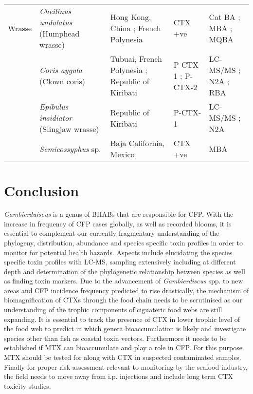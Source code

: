 \documentclass[12pt]{article}
\begin{document}
\begin{longtable}{ | p{2cm} | p{3cm} | p{4.5cm} | p{2cm} | p{3cm} | }
	\hline
	Wrasse & \emph{Cheilinus undulatus} (Humphead wrasse) & Hong Kong, China \cite{wong2005study,wong2009solid}; French Polynesia \cite{bagnis1987use} & CTX +ve \cite{bagnis1987use,wong2005study,wong2009solid} & Cat BA \cite{bagnis1987use}; MBA \cite{bagnis1987use,wong2005study,wong2009solid}; MQBA \cite{bagnis1987use} \\
	& \emph{Coris aygula} (Clown coris) & Tubuai, French Polynesia \cite{darius2007ciguatera}; Republic of Kiribati \cite{mak2013pacific} & P-CTX-1 \cite{mak2013pacific}; P-CTX-2 \cite{mak2013pacific} & LC-MS/MS \cite{mak2013pacific}; N2A \cite{mak2013pacific}; RBA \cite{darius2007ciguatera} \\
	& \emph{Epibulus insidiator} (Slingjaw wrasse) & Republic of Kiribati \cite{mak2013pacific} & P-CTX-1 \cite{mak2013pacific} & LC-MS/MS \cite{mak2013pacific}; N2A \cite{mak2013pacific} \\
	& \emph{Semicossyphus} sp. & Baja California, Mexico \cite{lechuga1995documented} & CTX +ve \cite{lechuga1995documented} & MBA \cite{lechuga1995documented}\\
	\hline
\end{longtable}

\section{Conclusion}
\emph{Gambierduiscus} is a genus of BHABs that are responsible for CFP. With the increase in frequency of CFP cases globally, as well as recorded blooms, it is essential to complement our currently fragmentary understanding of the phylogeny, distribution, abundance and species specific toxin profiles in order to monitor for potential health hazards. Aspects include elucidating the species specific toxin profiles with LC-MS, sampling extensively including at different depth and determination of the phylogenetic relationship between species as well as finding toxin markers.
Due to the  advancement of \emph{Gambierdiscus} spp. to new areas and CFP incidence frequency predicted to rise drastically, the mechanism of biomagnification of CTXs through the food chain needs to be scrutinised as our understanding of the trophic components of ciguateric food webs are still expanding.
It is essential to track the presence of CTX in lower trophic level of the food web to predict in which genera bioaccumulation is likely \cite{mak2013pacific} and investigate species other than fish as coastal toxin vectors. Furthermore it needs to be established if MTX can bioaccumulate and play a role in CFP. For this purpose MTX should be tested for along with CTX in suspected contaminated samples.
Finally for proper risk assessment relevant to monitoring by the seafood industry, the field needs to move away from i.p. injections and include long term CTX toxicity studies.


\newpage



\end{document}
